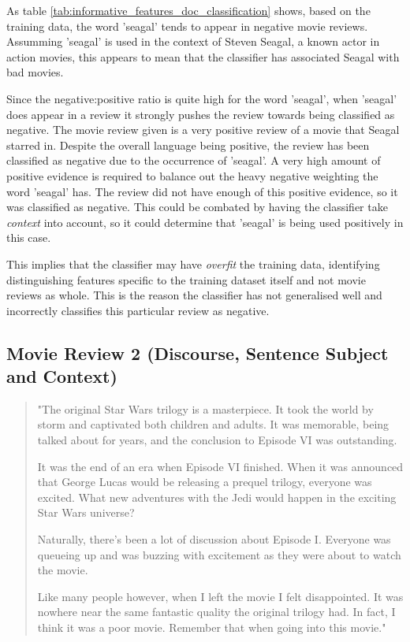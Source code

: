\documentclass{article}
\begin{document}
As table \ref{tab:informative_features_doc_classification} shows, based on the training data, the word 'seagal' tends to appear in negative movie reviews. Assumming 'seagal' is used in the context of Steven Seagal, a known actor in action movies, this appears to mean that the classifier has associated Seagal with bad movies.

Since the negative:positive ratio is quite high for the word 'seagal', when 'seagal' does appear in a review it strongly pushes the review towards being classified as negative. The movie review given is a very positive review of a movie that Seagal starred in. Despite the overall language being positive, the review has been classified as negative due to the occurrence of 'seagal'. A very high amount of positive evidence is required to balance out the heavy negative weighting the word 'seagal' has. The review did not have enough of this positive evidence, so it was classified as negative. This could be combated by having the classifier take \textit{context} into account, so it could determine that 'seagal' is being used positively in this case.

This implies that the classifier may have \textit{overfit} the training data, identifying distinguishing features specific to the training dataset itself and not movie reviews as whole. This is the reason the classifier has not generalised well and incorrectly classifies this particular review as negative.

\subsection{Movie Review 2 (Discourse, Sentence Subject and Context)}

\begin{quote}
"The original Star Wars trilogy is a masterpiece. It took the world by storm and captivated both children and adults. It was memorable, being talked about for years, and the conclusion to Episode VI was outstanding.

It was the end of an era when Episode VI finished. When it was announced that George Lucas would be releasing a prequel trilogy, everyone was excited. What new adventures with the Jedi would happen in the exciting Star Wars universe?

Naturally, there's been a lot of discussion about Episode I. Everyone was queueing up and was buzzing with excitement as they were about to watch the movie.

Like many people however, when I left the movie I felt disappointed. It was nowhere near the same fantastic quality the original trilogy had. In fact, I think it was a poor movie. Remember that when going into this movie."
\end{quote}
\end{document}

